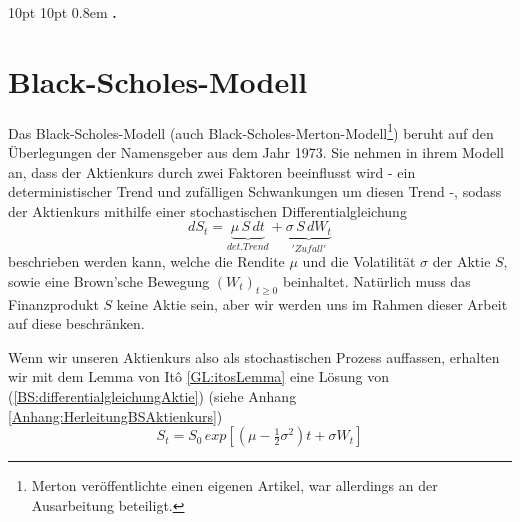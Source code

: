 
{10pt}%
{10pt}%
{\normalfont}%
{}%
{\normalfont}%
{}%
{0.8em}%
{\bfseries{.}}%
 




\chapter{Black-Scholes-Modell}               %
\label{cha:black-Scholes-Modell}             %

Das Black-Scholes-Modell (auch Black-Scholes-Merton-Modell\footnote{Merton veröffentlichte einen eigenen Artikel, war allerdings an der Ausarbeitung beteiligt.}) beruht auf den \; Überlegungen der Namensgeber aus dem Jahr 1973. Sie nehmen in ihrem Modell an, dass der Aktienkurs durch zwei Faktoren beeinflusst wird - ein deterministischer Trend und zufälligen Schwankungen um diesen Trend -, sodass der Aktienkurs mithilfe einer stochastischen Differentialgleichung 
\begin{equation}
dS_t = \underbrace{\mu\,S\,dt}_{det. Trend}  + \underbrace{\sigma\,S\,dW_t}_{'Zufall'} \label{BS:differentialgleichungAktie}  
\end{equation}
beschrieben werden kann, welche die Rendite $\mu$ und die Volatilität $\sigma$ der Aktie $S$, sowie eine Brown'sche Bewegung $\left(W_t\right)_{t \geq 0}$ beinhaltet. Natürlich muss das Finanzprodukt $S$ keine Aktie sein, aber wir werden uns im Rahmen dieser Arbeit auf diese beschränken.

Wenn wir unseren Aktienkurs also als stochastischen Prozess auffassen, erhalten wir mit dem Lemma von Itô \ref{GL:itosLemma} eine Lösung von (\ref{BS:differentialgleichungAktie}) (siehe Anhang \ref{Anhang:HerleitungBSAktienkurs}) 
\begin{equation}
S_t = S_0\,exp\left[ \left( \mu - \tfrac{1}{2}\sigma^2\right)t + \sigma W_t\right] \label{BS:aktienkurs}
\end{equation}

